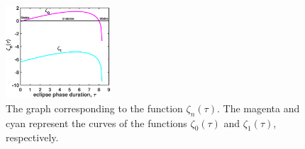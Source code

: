 \documentclass{CMHPhD-SIVD}
\begin{document}
\begin{figure}[h!]
\centering
\includegraphics[height=0.2\textheight,width=0.35\textwidth]{F2.eps}
\vspace{3mm}
\caption{The graph corresponding to the function $\zeta_n(\tau)$. The magenta and cyan represent the curves of the functions $\zeta_0(\tau)$ and $\zeta_1(\tau)$, respectively.}
\label{Fig.3b}
\end{figure}
\end{document}
